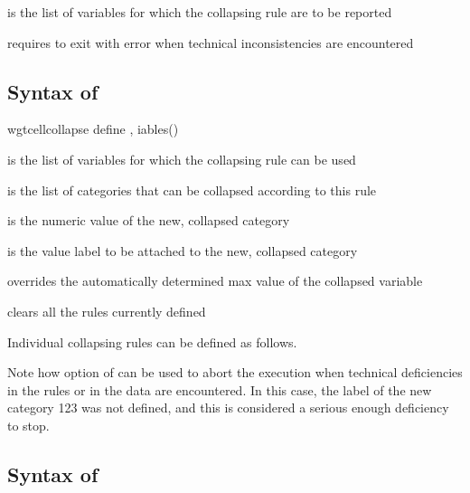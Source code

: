 \hangpara
{} is the list of variables for which the collapsing rule are to be reported

\hangpara
{} requires  to exit with error when technical inconsistencies are encountered

\subsection{Syntax of }

\begin{stsyntax}
wgtcellcollapse define
,
iables(\varlist)
\end{stsyntax}

\hangpara
{} is the list of variables for which the collapsing rule can be used

\hangpara
{} is the list of categories that can be collapsed according to this rule

\hangpara
{} is the numeric value of the new, collapsed category

\hangpara
{} is the value label to be attached to the new, collapsed category

\hangpara
{} overrides the automatically determined max value of the collapsed variable

\hangpara
{} clears all the rules currently defined

Individual collapsing rules can be defined as follows.

\begin{stlog}
\nullskip
\end{stlog}

Note how  option of  can be used to abort the execution
when technical deficiencies in the rules or in the data are encountered. In this case,
the label of the new category 123 was not defined, and this is considered a serious
enough deficiency to stop.

\begin{stlog}
\nullskip
\end{stlog}

\subsection{Syntax of }


